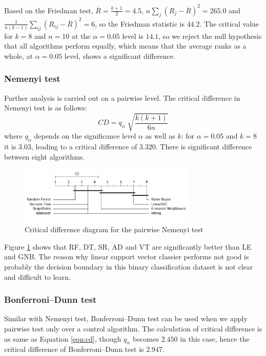 Based on the Friedman test, $\overline{R} = \frac{k+1}{2} = 4.5$, $n\displaystyle\sum_{j}^{} (R_j - \overline{R})^2 = 265.0$  and $\frac{1}{n(k - 1)}\displaystyle\sum_{ij}^{} (R_{ij} - \overline{R})^2 = 6$, so the Friedman statistic is $44.2$. The critical value for $k = 8$ and $n = 10$ at the $\alpha = 0.05$ level is $14.1$, so we reject the null hypothesis that all algorithms perform equally, which means that the average ranks as a whole, at $\alpha = 0.05$  level, shows a significant difference.

\subsubsection{Nemenyi test}
Further analysis is carried out on a pairwise level. The critical difference in  Nemenyi test\citep{Nemenyi} is as follows:
\begin{equation}
\label{eqn:cd}
CD = q_\alpha \sqrt[]{\frac{k(k + 1)}{6n}}
\end{equation}
where $q_\alpha$ depends on the significance level $\alpha$ as well as $k$: for $\alpha = 0.05$ and $k = 8$ it is $3.03$, leading to a critical difference of $3.320$. There is significant difference between eight algorithms.

\begin{figure}[h]
  \includegraphics[width=0.75\textwidth]{Nemenyi diagram.png}
\caption{Critical difference diagram for the pairwise Nemenyi test}
\label{fig:Nemenyi test}       %
\end{figure}

Figure \ref{fig:Nemenyi test} shows that RF, DT, SR, AD and VT are significantly better than LE and GNB. The reason why linear support vector classier performs not good is probably the decision boundary in this binary classification dataset is not clear and difficult to learn.

\subsubsection{Bonferroni–Dunn test}
Similar with Nemenyi test, Bonferroni–Dunn test can be used when we apply pairwise test only over a control algorithm. The calculation of critical difference is as same as Equation \ref{eqn:cd}, though $q_\alpha$ becomes $2.450$ in this case, hence the critical difference of Bonferroni–Dunn test is $2.947$. 

